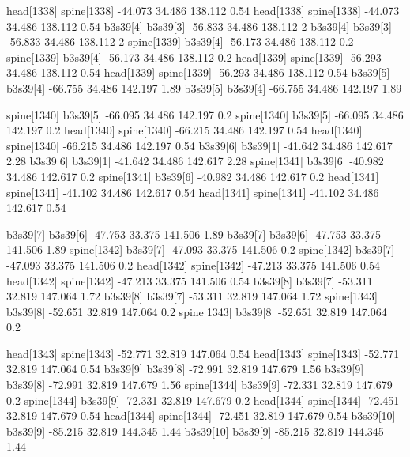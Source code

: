 head[1338]    spine[1338]    -44.073    34.486    138.112    0.54
head[1338]    spine[1338]    -44.073    34.486    138.112    0.54
b3s39[4]    b3s39[3]    -56.833    34.486    138.112    2
b3s39[4]    b3s39[3]    -56.833    34.486    138.112    2
spine[1339]    b3s39[4]    -56.173    34.486    138.112    0.2
spine[1339]    b3s39[4]    -56.173    34.486    138.112    0.2
head[1339]    spine[1339]    -56.293    34.486    138.112    0.54
head[1339]    spine[1339]    -56.293    34.486    138.112    0.54
b3s39[5]    b3s39[4]    -66.755    34.486    142.197    1.89
b3s39[5]    b3s39[4]    -66.755    34.486    142.197    1.89


spine[1340]    b3s39[5]    -66.095    34.486    142.197    0.2
spine[1340]    b3s39[5]    -66.095    34.486    142.197    0.2
head[1340]    spine[1340]    -66.215    34.486    142.197    0.54
head[1340]    spine[1340]    -66.215    34.486    142.197    0.54
b3s39[6]    b3s39[1]    -41.642    34.486    142.617    2.28
b3s39[6]    b3s39[1]    -41.642    34.486    142.617    2.28
spine[1341]    b3s39[6]    -40.982    34.486    142.617    0.2
spine[1341]    b3s39[6]    -40.982    34.486    142.617    0.2
head[1341]    spine[1341]    -41.102    34.486    142.617    0.54
head[1341]    spine[1341]    -41.102    34.486    142.617    0.54


b3s39[7]    b3s39[6]    -47.753    33.375    141.506    1.89
b3s39[7]    b3s39[6]    -47.753    33.375    141.506    1.89
spine[1342]    b3s39[7]    -47.093    33.375    141.506    0.2
spine[1342]    b3s39[7]    -47.093    33.375    141.506    0.2
head[1342]    spine[1342]    -47.213    33.375    141.506    0.54
head[1342]    spine[1342]    -47.213    33.375    141.506    0.54
b3s39[8]    b3s39[7]    -53.311    32.819    147.064    1.72
b3s39[8]    b3s39[7]    -53.311    32.819    147.064    1.72
spine[1343]    b3s39[8]    -52.651    32.819    147.064    0.2
spine[1343]    b3s39[8]    -52.651    32.819    147.064    0.2


head[1343]    spine[1343]    -52.771    32.819    147.064    0.54
head[1343]    spine[1343]    -52.771    32.819    147.064    0.54
b3s39[9]    b3s39[8]    -72.991    32.819    147.679    1.56
b3s39[9]    b3s39[8]    -72.991    32.819    147.679    1.56
spine[1344]    b3s39[9]    -72.331    32.819    147.679    0.2
spine[1344]    b3s39[9]    -72.331    32.819    147.679    0.2
head[1344]    spine[1344]    -72.451    32.819    147.679    0.54
head[1344]    spine[1344]    -72.451    32.819    147.679    0.54
b3s39[10]    b3s39[9]    -85.215    32.819    144.345    1.44
b3s39[10]    b3s39[9]    -85.215    32.819    144.345    1.44


